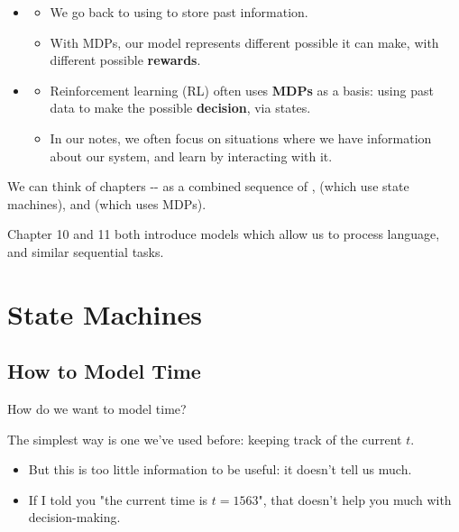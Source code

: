 \begin{itemize}
            \item {}
                \begin{itemize}
                    \item We go back to using  to store past information.
                    \item With MDPs, our model represents different possible  it can make, with different possible \textbf{rewards}.
                \end{itemize}

            \item {}
                \begin{itemize}
                    \item Reinforcement learning (RL) often uses \textbf{MDPs} as a basis: using past data to make the  possible \textbf{decision}, via states.
                    \item In our notes, we often focus on situations where we have  information about our system, and learn by interacting with it.
                \end{itemize}
        \end{itemize}

        We can think of chapters -- as a combined sequence of ,  (which use state machines), and  (which uses MDPs).

        Chapter 10 and 11 both introduce models which allow us to process language, and similar sequential tasks.

\pagebreak

\section{State Machines}

    \subsection{How to Model Time}

        How do we want to model time?

        The simplest way is one we've used before: keeping track of the current  $t$.

        \begin{itemize}
            \item But this is too little information to be useful: it doesn't tell us much.
            \item \miniex If I told you "the current time is $t=1563$", that doesn't help you much with decision-making.
        \end{itemize}


